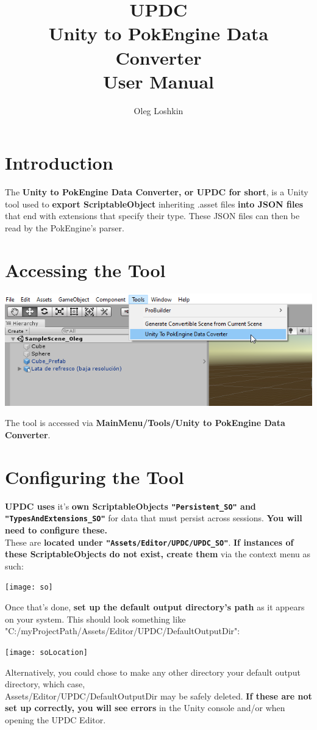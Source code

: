 \documentclass[10pt,a4paper]{article}
\author{Oleg Loshkin}
\title{\textbf{UPDC}\\Unity to PokEngine Data Converter\\\textbf{User Manual}}
\begin{document}
\maketitle
\section{Introduction}
The \textbf{Unity to PokEngine Data Converter, or UPDC for short}, is a Unity tool used to \textbf{export ScriptableObject} inheriting .asset files \textbf{into JSON files} that end with extensions that specify their type. These JSON files can then be read by the PokEngine's parser.

\section{Accessing the Tool}
\begin{center}
\includegraphics[scale=1.0]{mainMenu}
\end{center}
The tool is accessed via \textbf{MainMenu/Tools/Unity to PokEngine Data Converter}.
\newpage

\section{Configuring the Tool}
\textbf{UPDC uses} it's \textbf{own ScriptableObjects \texttt{"Persistent\_SO"} and \texttt{"TypesAndExtensions\_SO"}} for data that must persist across sessions. \textbf{You will need to configure these.}\\
These are \textbf{located under \texttt{"Assets/Editor/UPDC/UPDC\_SO"}}. \textbf{If instances of these ScriptableObjects do not exist, create them} via the context menu as such:
\begin{center}
\texttt{[image: so]}
\end{center}
\newpage
\noindent Once that's done, \textbf{set up the default output directory's path} as it appears on your system. This should look something like "C:/myProjectPath/Assets/Editor/UPDC/DefaultOutputDir":
\begin{center}
\texttt{[image: soLocation]}
\end{center}
Alternatively, you could chose to make any other directory your default output directory, which case, \\Assets/Editor/UPDC/DefaultOutputDir may be safely deleted.
\textbf{If these are not set up correctly, you will see errors} in the Unity console and/or when opening the UPDC Editor.
\end{document}

